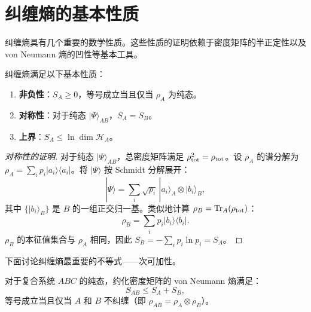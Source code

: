 \section{纠缠熵的基本性质}

纠缠熵具有几个重要的数学性质。这些性质的证明依赖于密度矩阵的半正定性以及 von Neumann 熵的凹性等基本工具。

\begin{property}[基本性质]\label{prop:basic}
纠缠熵满足以下基本性质：
\begin{enumerate}
    \item \textbf{非负性}：$S_A \geq 0$，等号成立当且仅当 $\rho_A$ 为纯态。
    \item \textbf{对称性}：对于纯态 $|\Psi\rangle_{AB}$，$S_A = S_B$。
    \item \textbf{上界}：$S_A \leq \ln \dim\mathcal{H}_A$。
\end{enumerate}
\end{property}

\begin{proof}[对称性的证明]
对于纯态 $|\Psi\rangle_{AB}$，总密度矩阵满足 $\rho_{\rm tot}^2 = \rho_{\rm tot}$。设 $\rho_A$ 的谱分解为 $\rho_A = \sum_i p_i |a_i\rangle\langle a_i|$。将 $|\Psi\rangle$ 按 Schmidt 分解展开：
\begin{equation}
    |\Psi\rangle = \sum_i \sqrt{p_i}\, |a_i\rangle_A \otimes |b_i\rangle_B,
\end{equation}
其中 $\{|b_i\rangle_B\}$ 是 $B$ 的一组正交归一基。类似地计算 $\rho_B = \Tr_A(\rho_{\rm tot})$：
\begin{equation}
    \rho_B = \sum_i p_i |b_i\rangle\langle b_i|.
\end{equation}
$\rho_B$ 的本征值集合与 $\rho_A$ 相同，因此 $S_B = -\sum_i p_i \ln p_i = S_A$。
\end{proof}

下面讨论纠缠熵最重要的不等式——次可加性。

\begin{theorem}[次可加性]\label{thm:subadditivity}
对于复合系统 $ABC$ 的纯态，约化密度矩阵的 von Neumann 熵满足：
\begin{equation}\label{eq:subadditivity}
    S_{AB} \leq S_A + S_B,
\end{equation}
等号成立当且仅当 $A$ 和 $B$ 不纠缠（即 $\rho_{AB} = \rho_A \otimes \rho_B$）。
\end{theorem}


